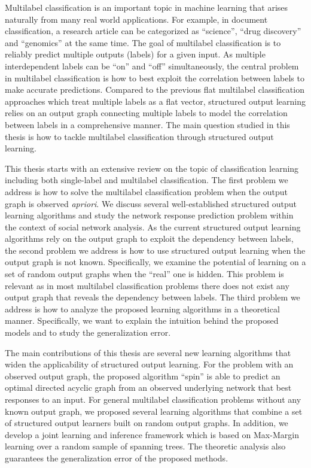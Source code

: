 \documentclass[10pt]{article}
\begin{document}
\setlength{\parindent}{3mm}
\small

\noindent Multilabel classification is an important topic in machine learning that arises naturally from many real world applications. For example, in document classification, a research article can be categorized as ``science'', ``drug discovery'' and ``genomics'' at the same time. The goal of multilabel classification is to reliably predict multiple outputs (labels) for a given input. As multiple interdependent labels can be ``on'' and ``off'' simultaneously, the central problem in multilabel classification is how to best exploit the correlation between labels to make accurate predictions. Compared to the previous flat multilabel classification approaches which treat multiple labels as a flat vector, structured output learning relies on an output graph connecting multiple labels to model the correlation between labels in a comprehensive manner. The main question studied in this thesis is how to tackle multilabel classification through structured output learning.

This thesis starts with an extensive review on the topic of classification learning including both single-label and multilabel classification. The first problem we address is how to solve the multilabel classification problem when the output graph is observed \textit{apriori}. We discuss several well-established structured output learning algorithms and study the network response prediction problem within the context of social network analysis. As the current structured output learning algorithms rely on the output graph to exploit the dependency between labels, the second problem we address is how to use structured output learning when the output graph is not known. Specifically, we examine the potential of learning on a set of random output graphs when the ``real'' one is hidden. This problem is relevant as in most multilabel classification problems there does not exist any output graph that reveals the dependency between labels. The third problem we address is how to analyze the proposed learning algorithms in a theoretical manner. Specifically, we want to explain the intuition behind the proposed models and to study the generalization error.

The main contributions of this thesis are several new learning algorithms that widen the applicability of structured output learning. For the problem with an observed output graph, the proposed algorithm ``{\sc spin}'' is able to predict an optimal directed acyclic graph from an observed underlying network that best responses to an input. For general multilabel classification problems without any known output graph, we proposed several learning algorithms that combine a set of structured output learners built on random output graphs. In addition, we develop a joint learning and inference framework which is based on Max-Margin learning over a random sample of spanning trees. The theoretic analysis also guarantees the generalization error of the proposed methods.
\end{document}
